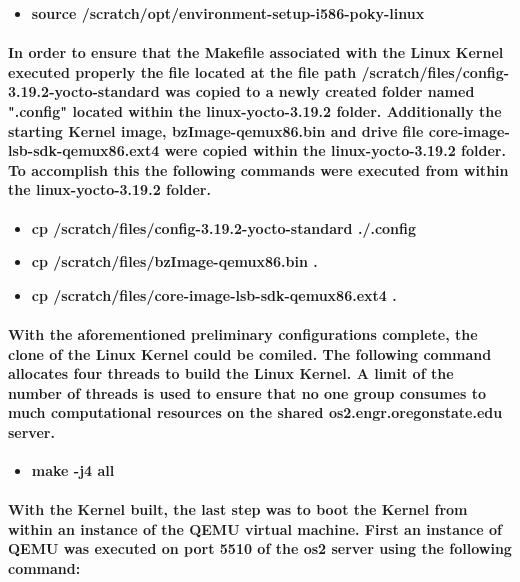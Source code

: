 \documentclass[10pt,onecolumn,draftclsnofoot]{article} %
\begin{document}
  \begin{itemize}
    \item \textbf{source /scratch/opt/environment-setup-i586-poky-linux}
  \end{itemize}

  \paragraph{\normalfont In order to ensure that the Makefile associated with the Linux Kernel executed properly the file located at the file path /scratch/files/config-3.19.2-yocto-standard was copied to a newly created folder named ".config" located within the linux-yocto-3.19.2 folder. Additionally the starting Kernel image, bzImage-qemux86.bin and drive file core-image-lsb-sdk-qemux86.ext4 were copied within the linux-yocto-3.19.2 folder. To accomplish this the following commands were executed from within the linux-yocto-3.19.2 folder.
  }

  \begin{itemize}
    \item \textbf{cp /scratch/files/config-3.19.2-yocto-standard ./.config}
    \item \textbf{cp /scratch/files/bzImage-qemux86.bin .}
    \item \textbf{cp /scratch/files/core-image-lsb-sdk-qemux86.ext4 .}
  \end{itemize}

  \paragraph{\normalfont With the aforementioned preliminary configurations complete, the clone of the Linux Kernel could be comiled. The following command allocates four threads to build the Linux Kernel. A limit of the number of threads is used to ensure that no one group consumes to much computational resources on the shared os2.engr.oregonstate.edu server.}

  \begin{itemize}
    \item \textbf{make -j4 all}
  \end{itemize}

  \paragraph{\normalfont With the Kernel built, the last step was to boot the Kernel from within an instance of the QEMU virtual machine. First an instance of QEMU was executed on port 5510 of the os2 server using the following command:}
\end{document}
